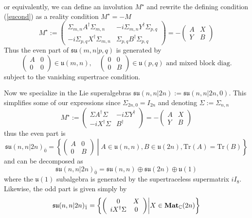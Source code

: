 \documentclass[a4paper,12pt]{article}
\numberwithin{equation}{section}
\numberwithin{thm}{section}
\numberwithin{exm}{section}
\newcommand{\tr}{\mathrm{Tr}}
\newcommand{\C}{{\mathbb C}}
\newcommand{\<}{{\langle}}
\renewcommand{\>}{{\rangle}}
\newcommand{\mf}{\mathfrak}
\newcommand{\dg}{\dagger}
\renewcommand{\S}{{\Sigma}}
\begin{document}
or equivalently, we can define an involution $M^\star$ and rewrite the defining condition (\ref{sucond}) as a reality condition $M^\star = -M$
	\begin{equation}
	M^\star := \left(
		\begin{array}{cc}
		\S_{m,n}A^\dg \S_{m,n} & -i\S_{m,n} Y^\dg \S_{p,q} \\
		-i\S_{p,q} X^\dg \S_{m,n} & \S_{p,q}B^\dg \S_{p,q}
		\end{array}
	\right) = - \left(
		\begin{array}{cc}
		A & X \\
		Y & B
		\end{array}
	\right)
	\end{equation}
Thus the even part of $\mf{su}(m,n|p,q)$ is generated by
	\begin{equation}
	\left(
		\begin{array}{cc}
		A & 0 \\
		0 & 0
		\end{array}
	\right) \in\mf{u}(m,n),\quad \left(
		\begin{array}{cc}
		0 & 0 \\
		0 & B
		\end{array}
	\right) \in\mf{u}(p,q)\text{ and mixed block diag.}
	\end{equation}
subject to the vanishing supertrace condition.

Now we specialize in the Lie superalgebras $\mf{su}(n,n|2n):= \mf{su}(n,n|2n,0)$. This simplifies some of our expressions since $\S_{2n,0} = I_{2n}$ and denoting $\S := \S_{n,n}$
	\begin{equation}
	M^\star := \left(
		\begin{array}{cc}
		\S A^\dg \S & -i\S Y^\dg \\
		-i X^\dg \S & B^\dg
		\end{array}
	\right) = - \left(
		\begin{array}{cc}
		A & X \\
		Y & B
		\end{array}
	\right)
	\end{equation}
thus the even part is
	\begin{equation}
	\mf{su}(n,n|2n)_{\bar 0} = \left\{ \left(
		\begin{array}{cc}
		A & 0 \\
		0 & B
		\end{array}
	\right) \middle| A\in\mf{u}(n,n), B \in\mf{u}(2n), \tr(A) = \tr(B) \right\}
	\end{equation}
and can be decomposed as
	\begin{equation}
	\mf{su}(n,n|2n)_{\bar 0} = \mf{su}(n,n) \oplus \mf{su}(2n) \oplus \mf{u}(1)
	\end{equation}
where the $\mf{u}(1)$ subalgebra is generated by the supertraceless supermatrix $i I_8$. Likewise, the odd part is given simply by
	\begin{equation}
	\mf{su}(n,n|2n)_{\bar 1} = \left\{ \left(
		\begin{array}{cc}
		0 & X \\
		iX^\dg \S & 0
		\end{array}
	\right) \middle| X\in {\bf Mat}_\C (2n) \right\}
	\end{equation}
\end{document}
